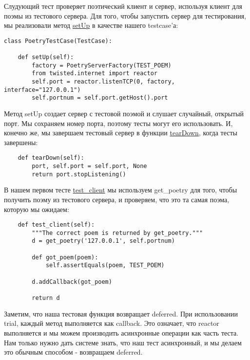 Слудующий тест проверяет поэтический клиент и сервер, используя клиент 
для поэмы из тестового сервера. Для того, чтобы запустить 
сервер для тестирования, мы реализовали метод 
\href{http://github.com/jdavisp3/twisted-intro/blob/master/tests/test\_poetry.py#L70}{setUp} 
в качестве нашего testcase'а:

 \begin{verbatim}
class PoetryTestCase(TestCase):

    def setUp(self):
        factory = PoetryServerFactory(TEST_POEM)
        from twisted.internet import reactor
        self.port = reactor.listenTCP(0, factory, interface="127.0.0.1")
        self.portnum = self.port.getHost().port
\end{verbatim} 



Метод setUp создает сервер с тестовой поэмой и слушает случайный, 
открытый порт. Мы сохраняем номер порта, поэтому тесты могут его 
использовать. И, конечно же, мы завершаем тестовый сервер в 
функции 
\href{http://github.com/jdavisp3/twisted-intro/blob/master/tests/test\_poetry.py#L76}{tearDown}, 
когда тесты завершены:

 \begin{verbatim}
    def tearDown(self):
        port, self.port = self.port, None
        return port.stopListening()
\end{verbatim} 

В нашем первом тесте 
\href{http://github.com/jdavisp3/twisted-intro/blob/master/tests/test\_poetry.py#L80}{test\_client} 
мы используем get\_poetry для того, чтобы получить поэму 
из тестового сервера, и проверяем, что это та самая поэма, которую мы ожидаем:

 \begin{verbatim}
    def test_client(self):
        """The correct poem is returned by get_poetry."""
        d = get_poetry('127.0.0.1', self.portnum)

        def got_poem(poem):
            self.assertEquals(poem, TEST_POEM)

        d.addCallback(got_poem)

        return d

\end{verbatim} 


Заметим, что наша тестовая функция возвращает deferred. 
При использовании trial, каждый метод выполняется как 
callback. Это означает, что reactor выполняется и  мы 
можем производить асинхронные операции как часть теста. 
Нам только нужно дать системе знать, что наш тест асинхронный, 
и мы делаем это обычным способом - возвращаем deferred.


